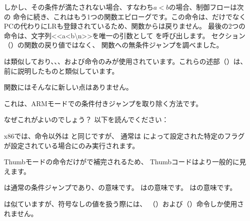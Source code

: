 
しかし、その条件が満たされない場合、すなわち$a<b$の場合、制御フローは次の
命令に続き、これはもう1つの関数エピローグです。この命令は、だけでなく\ac{PC}の代わりに\ac{LR}も登録されているため、関数からは戻りません。
最後の2つの命令は、文字列<<a<b\textbackslash{}n>>を唯一の引数として \printf を呼び出します。  
\printf セクション（）の関数の戻り値ではなく、 \printf 関数への無条件ジャンプを調べました。

は類似しており、、、および命令のみが使用されています。これらの述部（）は、前に説明したものと類似しています。

\main 関数にはそんなに新しい点はありません。



これは、ARMモードでの条件付きジャンプを取り除く方法です。

なぜこれがよいのでしょう？ 以下を読んでください：


x86では、命令以外は \MOV と同じですが、
通常は \CMP によって設定された特定のフラグが設定されている場合にのみ実行されます。

\mysubparagraph{\OptimizingKeilVI (\ThumbMode)}




Thumbモードの命令だけがで補完されるため、
Thumbコードはより一般的に見えます。

は通常の条件ジャンプであり、の意味です。 
はの意味です。
はの意味です。

は似ていますが、符号なしの値を扱う際には、
（）および（）命令しか使用されません。
